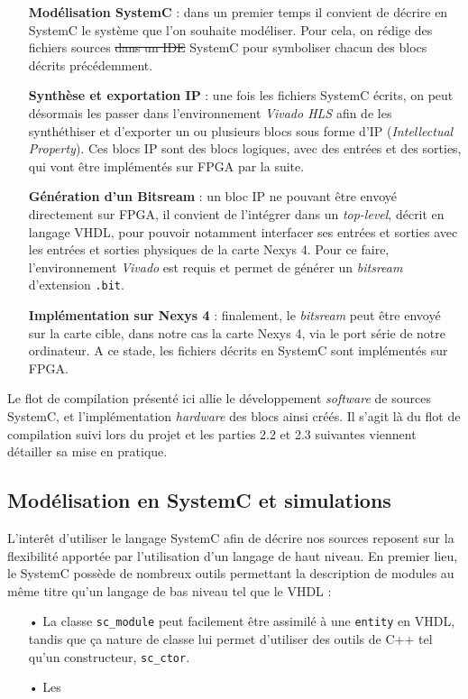 \documentclass[a4paper,12pt]{article}
\begin{document}
	\begin{itemize}
		\item[\textbullet] \textbf{Modélisation SystemC} : dans un premier temps il convient de décrire en SystemC le système que l'on souhaite modéliser. Pour cela, on rédige des fichiers sources \sout{dans un IDE} SystemC pour symboliser chacun des blocs décrits précédemment. \\
		\item[\textbullet] \textbf{Synthèse et exportation IP} : une fois les fichiers SystemC écrits, on peut désormais les passer dans l'environnement \textit{Vivado HLS} afin de les synthéthiser et d'exporter un ou plusieurs blocs sous forme d'IP (\textit{Intellectual Property}). Ces blocs IP sont des blocs logiques, avec des entrées et des sorties, qui vont être implémentés sur FPGA par la suite. \\
		\item[\textbullet] \textbf{Génération d'un Bitsream} : un bloc IP ne pouvant être envoyé directement sur FPGA, il convient de l'intégrer dans un \textit{top-level}, décrit en langage VHDL, pour pouvoir notamment interfacer ses entrées et sorties avec les entrées et sorties physiques de la carte Nexys 4. Pour ce faire, l'environnement \textit{Vivado} est requis et permet de générer un \textit{bitsream} d'extension \texttt{.bit}. \\
		\item[\textbullet] \textbf{Implémentation sur Nexys 4} : finalement, le \textit{bitsream} peut être envoyé sur la carte cible, dans notre cas la carte Nexys 4, via le port série de notre ordinateur. A ce stade, les fichiers décrits en SystemC sont implémentés sur FPGA.\\
	\end{itemize}
	Le flot de compilation présenté ici allie le développement \textit{software} de sources SystemC, et l'implémentation \textit{hardware} des blocs ainsi créés. Il s'agit là du flot de compilation suivi lors du projet et les parties 2.2 et 2.3 suivantes viennent détailler sa mise en pratique.


\subsection{Modélisation en SystemC et simulations}
L'interêt d'utiliser le langage SystemC afin de décrire nos sources reposent sur la flexibilité apportée par l'utilisation d'un langage de haut niveau. En premier lieu, le SystemC possède de nombreux outils permettant la description de modules au même titre qu'un langage de bas niveau tel que le VHDL :
\begin{itemize}
\item[•] La classe \texttt{sc\_module} peut facilement être assimilé à une \texttt{entity} en VHDL, tandis que ça nature de classe lui permet d'utiliser des outils de C++ tel qu'un constructeur, \texttt{sc\_ctor}.
\item[•] Les
\end{itemize}
\end{document}
